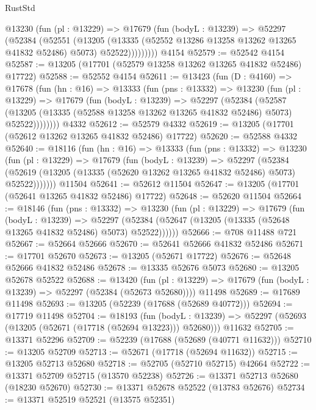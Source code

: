 \begin{lexlean}{RustStd}
\begin{coremodule}
          @13230
            (fun (pl : @13229) =>
            @17679
              (fun (bodyL : @13239) =>
              @52297
                (@52384
                  (@52551
                    (@13205
                      (@13335 (@52552 @13286 @13258 @13262 @13265 @41832 @52486) @5073)
                      @52522)))))))))
    @4154
@52579 := @52542 @4154
@52587 := @13205 (@17701 (@52579 @13258 @13262 @13265 @41832 @52486) @17722)
@52588 := @52552 @4154
@52611 := @13423
    (fun (D : @4160) =>
    @17678
      (fun (hn : @16) =>
      @13333
        (fun (pns : @13332) =>
        @13230
          (fun (pl : @13229) =>
          @17679
            (fun (bodyL : @13239) =>
            @52297
              (@52384
                (@52587
                  (@13205 (@13335 (@52588 @13258 @13262 @13265 @41832 @52486) @5073) @52522))))))))
    @4332
@52612 := @52579 @4332
@52619 := @13205 (@17701 (@52612 @13262 @13265 @41832 @52486) @17722)
@52620 := @52588 @4332
@52640 := @18116
    (fun (hn : @16) =>
    @13333
      (fun (pns : @13332) =>
      @13230
        (fun (pl : @13229) =>
        @17679
          (fun (bodyL : @13239) =>
          @52297
            (@52384
              (@52619 (@13205 (@13335 (@52620 @13262 @13265 @41832 @52486) @5073) @52522)))))))
    @11504
@52641 := @52612 @11504
@52647 := @13205 (@17701 (@52641 @13265 @41832 @52486) @17722)
@52648 := @52620 @11504
@52664 := @18146
    (fun (pns : @13332) =>
    @13230
      (fun (pl : @13229) =>
      @17679
        (fun (bodyL : @13239) =>
        @52297 (@52384 (@52647 (@13205 (@13335 (@52648 @13265 @41832 @52486) @5073) @52522))))))
@52666 := @708 @11488 @721
@52667 := @52664 @52666
@52670 := @52641 @52666 @41832 @52486
@52671 := @17701 @52670
@52673 := @13205 (@52671 @17722)
@52676 := @52648 @52666 @41832 @52486
@52678 := @13335 @52676 @5073
@52680 := @13205 @52678 @52522
@52688 := @13420
    (fun (pl : @13229) => @17679 (fun (bodyL : @13239) => @52297 (@52384 (@52673 @52680))))
    @11498
@52689 := @17689 @11498
@52693 := @13205 (@52239 (@17688 (@52689 @40772)))
@52694 := @17719 @11498
@52704 := @18193
    (fun (bodyL : @13239) => @52297 (@52693 (@13205 (@52671 (@17718 (@52694 @13223))) @52680)))
    @11632
@52705 := @13371 @52296
@52709 := @52239 (@17688 (@52689 (@40771 @11632)))
@52710 := @13205 @52709
@52713 := @52671 (@17718 (@52694 @11632))
@52715 := @13205 @52713 @52680
@52718 := @52705 (@52710 @52715) @42664
@52722 := @13371 @52709 @52715 (@13570 @52238)
@52726 := @13371 @52713 @52680 (@18230 @52670)
@52730 := @13371 @52678 @52522 (@13783 @52676)
@52734 := @13371 @52519 @52521 (@13575 @52351)

\end{coremodule}
\end{lexlean}
